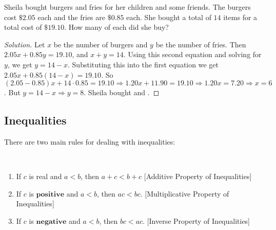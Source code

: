 \documentclass[../main.tex]{subfiles}
\begin{document}
%
\begin{problem}
Sheila bought burgers and fries for her children and some friends. The burgers cost $\$2.05$ each and the fries are $\$0.85$ each. She bought a total of $14$ items for a total cost of $\$19.10$. How many of each did she buy?
\end{problem}
\begin{proof}[Solution]
Let $x$ be the number of burgers and $y$ be the number of fries. Then $2.05x + 0.85y = 19.10$, and $x+y = 14$. Using this second equation and solving for $y$, we get $y = 14 - x$. Substituting this into the first equation we get $2.05x + 0.85(14-x) = 19.10$. So $(2.05 - 0.85)x + 14\cdot 0.85 = 19.10 \Rightarrow 1.20x + 11.90 = 19.10\Rightarrow 1.20x = 7.20 \Rightarrow \boxed{x = 6}$. But $y = 14 - x \Rightarrow \boxed{y = 8}$. Sheila bought  and .
\end{proof}
%
\subsection{Inequalities}
%
There are two main rules for dealing with inequalities:
%
\begin{properties}\label{property:north_shore_properties_of_inequalities}
\
\begin{enumerate}[itemsep=0pt]
    \item \label{property:north_shore_additive_property_inequals}If $c$ is real and $a<b$, then $a+c<b+c$ \hfill [Additive Property of Inequalities]
    \item \label{property:north_shore_multiplicative_property_inequals}If $c$ is $\mathbf{positive}$ and $a<b$, then $ac < bc$. \hfill [Multiplicative Property of Inequalities]
    \item \label{property:north_shore_inverse_property_inequals}If $c$ is $\mathbf{negative}$ and $a<b$, then $bc < ac$. \hfill [Inverse Property of Inequalities]
\end{enumerate}
\end{properties}
%
\end{document}
